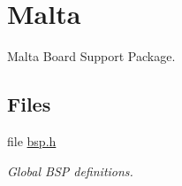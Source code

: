 \hypertarget{group__RTEMSBSPsMIPSMalta}{}\section{Malta}
\label{group__RTEMSBSPsMIPSMalta}


Malta Board Support Package.  


\subsection*{Files}
\begin{DoxyCompactItemize}
\item 
file \mbox{\hyperlink{bsps_2mips_2malta_2include_2bsp_8h}{bsp.\+h}}
\begin{DoxyCompactList}\small\item\em Global B\+SP definitions. \end{DoxyCompactList}\end{DoxyCompactItemize}
